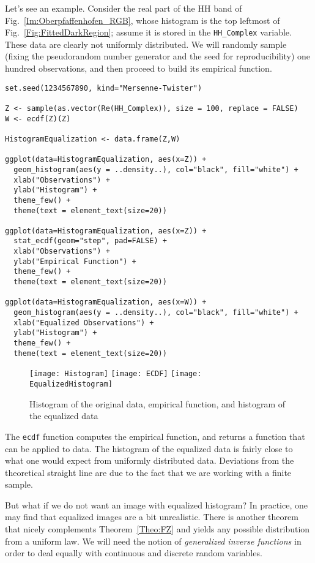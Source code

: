 Let's see an example.
Consider the real part of the HH band of Fig.~\ref{Im:Oberpfaffenhofen_RGB}, whose histogram is the top leftmost of Fig.~\ref{Fig:FittedDarkRegion}; assume it is stored in the \verb|HH_Complex| variable.
These data are clearly not uniformly distributed.
We will randomly sample (fixing the pseudorandom number generator and the seed for reproducibility) one hundred observations, and then proceed to build its empirical function.

\begin{lstlisting}
set.seed(1234567890, kind="Mersenne-Twister")

Z <- sample(as.vector(Re(HH_Complex)), size = 100, replace = FALSE)
W <- ecdf(Z)(Z)

HistogramEqualization <- data.frame(Z,W)
 
ggplot(data=HistogramEqualization, aes(x=Z)) +
  geom_histogram(aes(y = ..density..), col="black", fill="white") +
  xlab("Observations") +
  ylab("Histogram") + 
  theme_few() +
  theme(text = element_text(size=20))

ggplot(data=HistogramEqualization, aes(x=Z)) +
  stat_ecdf(geom="step", pad=FALSE) +
  xlab("Observations") +
  ylab("Empirical Function") + 
  theme_few() +
  theme(text = element_text(size=20))

ggplot(data=HistogramEqualization, aes(x=W)) +
  geom_histogram(aes(y = ..density..), col="black", fill="white") +
  xlab("Equalized Observations") +
  ylab("Histogram") + 
  theme_few() +
  theme(text = element_text(size=20))
\end{lstlisting}

\begin{figure*}[hbt]
\centering
\texttt{[image: Histogram]}
\texttt{[image: ECDF]}
\texttt{[image: EqualizedHistogram]}
\caption{Histogram of the original data, empirical function, and histogram of the equalized data}
\end{figure*}

The \verb|ecdf| function computes the empirical function, and returns a function that can be applied to data.
The histogram of the equalized data is fairly close to what one would expect from uniformly distributed data.
Deviations from the theoretical straight line are due to the fact that we are working with a finite sample.

But what if we do not want an image with equalized histogram?
In practice, one may find that equalized images are a bit unrealistic.
There is another theorem that nicely complements Theorem~\ref{Theo:FZ} and yields any possible distribution from a uniform law.
We will need the notion of \textit{generalized inverse functions} in order to deal equally with continuous and discrete random variables.

